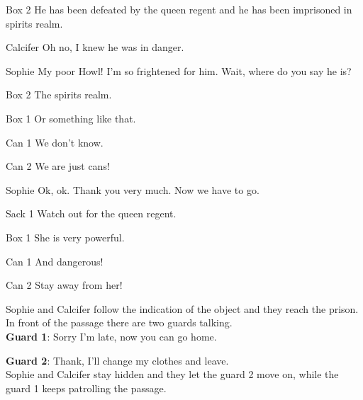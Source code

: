 \begin{screenplay}
\begin{dialogue}{Box 2}
He has been defeated by the queen regent and he has been imprisoned in spirits realm.
\end{dialogue}
\begin{dialogue}{Calcifer}
Oh no, I knew he was in danger.
\end{dialogue}
\begin{dialogue}{Sophie}
My poor Howl! I’m so frightened for him. Wait, where do you say he is?
\end{dialogue}
\begin{dialogue}{Box 2}
The spirits realm.
\end{dialogue}
\begin{dialogue}{Box 1}
Or something like that.
\end{dialogue}
\begin{dialogue}{Can 1}
We don’t know.
\end{dialogue}
\begin{dialogue}{Can 2}
We are just cans!
\end{dialogue}
\begin{dialogue}{Sophie}
Ok, ok. Thank you very much. Now we have to go.
\end{dialogue}
\begin{dialogue}{Sack 1}
Watch out for the queen regent.
\end{dialogue}
\begin{dialogue}{Box 1}
She is very powerful.
\end{dialogue}
\begin{dialogue}{Can 1}
And dangerous!
\end{dialogue}
\begin{dialogue}{Can 2}
Stay away from her!
\end{dialogue}
\end{screenplay}

\noindent Sophie and Calcifer follow the indication of the object and they reach the prison. In front of the passage there are two guards talking.\\

\textbf{Guard 1}: Sorry I’m late, now you can go home.

\textbf{Guard 2}: Thank, I’ll change my clothes and leave.\\

\noindent Sophie and Calcifer stay hidden and they let the guard 2 move on, while the guard 1 keeps patrolling the passage.\\

